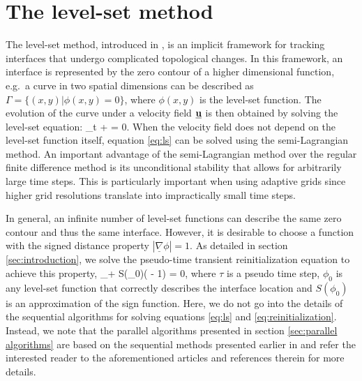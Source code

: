 \section{The level-set method}\label{sec:levelset method}
The level-set method, introduced in \cite{Osher;Sethian:88:Fronts-Propagating-w}, is an implicit framework for tracking interfaces that undergo complicated topological changes. In this framework, an interface is represented by the zero contour of a higher dimensional function, e.g.\ a curve in two spatial dimensions can be described as $\Gamma = \{(x,y) | \phi(x,y) = 0\}$, where $\phi(x,y)$ is the level-set function. The evolution of the curve under a velocity field $\underline{\mathbf{u}}$ is then obtained by solving the level-set equation:
\be
\phi_t + \underline{} \cdot \underline{\nabla} \phi = 0.
\label{eq:ls}
\ee
When the velocity field does not depend on the level-set function itself, equation \eqref{eq:ls} can be solved using the semi-Lagrangian method. An important advantage of the semi-Lagrangian method over the regular finite difference method is its unconditional stability that allows for arbitrarily large time steps. This is particularly important when using adaptive grids since higher grid resolutions translate into impractically small time steps.

In general, an infinite number of level-set functions can describe the same
zero contour and thus the same interface.
However, it is desirable to choose a function with the signed distance property
$|\underline{\nabla} \phi| = 1$. As detailed in section \ref{sec:introduction},
we solve the pseudo-time transient reinitialization equation
\cite{Sussman;Smereka;Osher:94:A-Level-Set-Approach,
Osher;Fedkiw:01:Level-Set-Methods:-A} to achieve this property,
\be
\phi_\tau + S(\phi_0)\left(\lvert \underline{\nabla} \phi \rvert - 1\right) = 0,
\label{eq:reinitialization}
\ee
where $\tau$ is a pseudo time step, $\phi_0$ is any level-set function that correctly describes the interface location and $S(\phi_0)$ is an approximation of the sign function. Here, we do not go into the details of the sequential algorithms for solving equations \eqref{eq:ls} and \eqref{eq:reinitialization}.
Instead, we note that the parallel algorithms presented in section \ref{sec:parallel
algorithms} are based on the sequential methods presented earlier in
\cite{Min;Gibou:07:A-second-order-accur} and refer the interested reader to the
aforementioned articles and references therein for more details.
